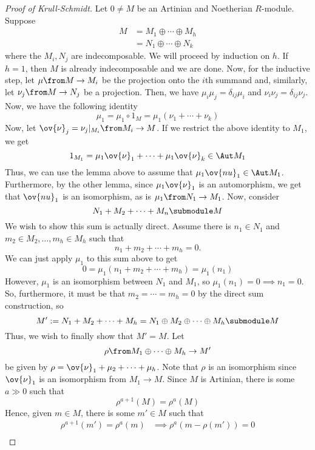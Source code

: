 \documentclass[11pt,leqno,oneside]{amsbook}
\numberwithin{thm}{section}
\begin{document}
\begin{proof}[Proof of Krull-Schmidt]
  Let \(0 \neq M\) be an Artinian and Noetherian \(R\)-module. Suppose
  \begin{align*}
    M & = M_1 \oplus \cdots \oplus M_h \\
    & = N_1 \oplus \cdots \oplus N_k
  \end{align*}
  where the \(M_i,N_j\) are indecomposable. We will proceed by
  induction on \(h\). If \(h=1\), then \(M\) is already indecomposable
  and we are done. Now, for the inductive step, let \(\mu \from M \to
  M_i\) be the projection onto the \(i\)th summand and, similarly, let
  \(\nu_j \from M \to N_j\) be a projection. Then, we have \(\mu_i
  \mu_j = \delta_{ij} \mu_i\) and \(\nu_i \nu_j = \delta_{ij}
  \nu_j\). Now, we have the following identity \[
    \mu_1 = \mu_1 \circ 1_M = \mu_1(\nu_1 + \cdots + \nu_k)
  \]
  Now, let \(\ov{\nu}_j = \nu_j |_{M_i} \from M_i \to M\). If we
  restrict the above identity to \(M_1\), we get \[
    1_{M_1} = \mu_1 \ov{\nu}_1 + \cdots + \mu_1 \ov{\nu}_k \in \Aut M_1
  \]
  Thus, we can use the lemma above to assume that \(\mu_1 \ov{nu}_1
  \in \Aut M_1\). Furthermore, by the other lemma, since \(\mu_1 \ov{\nu}_1\) is
  an automorphism, we get that \(\ov{nu}_1\) is an isomorphism, as is
  \(\mu_1 \from N_1 \to M_1\). Now,
  consider \[
    N_1 + M_2 + \cdots + M_n \submodule M
  \]
  We wish to show this sum is actually direct. Assume there is \(n_1
  \in N_1\) and \(m_2 \in M_2, \ldots, m_h \in M_h\) such that \[
    n_1 + m_2 + \cdots + m_h = 0.
  \]
  We can just apply \(\mu_1\) to this sum above to get \[
    0 = \mu_1(n_1 + m_2 + \cdots + m_h) = \mu_1(n_1)
  \]
  However, \(\mu_1\) is an isomorphism between \(N_1\) and \(M_1\), so
  \(\mu_1(n_1) = 0 \implies n_1 = 0\). So, furthermore, it must be
  that \(m_2 = \cdots = m_h = 0\) by the direct sum construction,
  so \[
    M' := N_1 + M_2 + \cdots + M_h = N_1 \oplus M_2 \oplus \cdots
    \oplus M_h \submodule M
  \]
  Thus, we wish to finally show that \(M' = M\). Let \[
    \rho \from M_1 \oplus \cdots \oplus M_h \to M'
  \]
  be given by \(\rho = \ov{\nu}_1 + \mu_2 + \cdots + \mu_h\). Note
  that \(\rho\) is an isomorphism since \(\ov{\nu}_1\) is an
  isomorphism from \(M_1 \to M\). Since
  \(M\) is Artinian, there is some \(a \gg 0\) such that \[
    \rho^{a+1}(M) = \rho^a(M)
  \]
  Hence, given \(m \in M\), there is some \(m' \in M\) such that
  \begin{align*}
    \rho^{a+1}(m') = \rho^a(m)
    & \implies \rho^a(m-\rho(m')) = 0 \\

\end{align*}
\end{proof}
\end{document}
